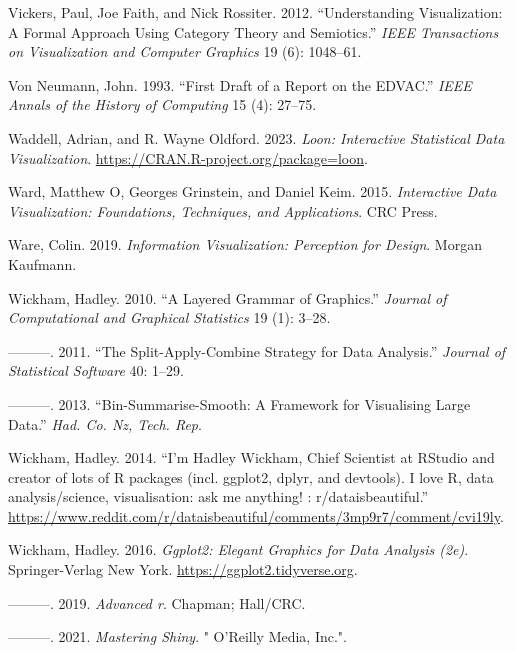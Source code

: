 \documentclass[
  openany]{book}
\newlength{\cslhangindent}
\newenvironment{CSLReferences}[2] %
 {\begin{list}{}{%
  \setlength{\itemindent}{0pt}
  \setlength{\leftmargin}{0pt}
  \setlength{\parsep}{0pt}
  \ifodd #1
   \setlength{\leftmargin}{\cslhangindent}
   \setlength{\itemindent}{-1\cslhangindent}
  \fi
  \setlength{\itemsep}{#2\baselineskip}}}
 {\end{list}}
\theoremstyle{definition}
\theoremstyle{definition}
\theoremstyle{definition}
\theoremstyle{definition}
\theoremstyle{remark}
\begin{document}
\begin{CSLReferences}{1}{0}
Vickers, Paul, Joe Faith, and Nick Rossiter. 2012. {``Understanding Visualization: A Formal Approach Using Category Theory and Semiotics.''} \emph{IEEE Transactions on Visualization and Computer Graphics} 19 (6): 1048--61.

Von Neumann, John. 1993. {``First Draft of a Report on the EDVAC.''} \emph{IEEE Annals of the History of Computing} 15 (4): 27--75.

Waddell, Adrian, and R. Wayne Oldford. 2023. \emph{Loon: Interactive Statistical Data Visualization}. \url{https://CRAN.R-project.org/package=loon}.

Ward, Matthew O, Georges Grinstein, and Daniel Keim. 2015. \emph{Interactive Data Visualization: Foundations, Techniques, and Applications}. CRC Press.

Ware, Colin. 2019. \emph{Information Visualization: Perception for Design}. Morgan Kaufmann.

Wickham, Hadley. 2010. {``A Layered Grammar of Graphics.''} \emph{Journal of Computational and Graphical Statistics} 19 (1): 3--28.

---------. 2011. {``The Split-Apply-Combine Strategy for Data Analysis.''} \emph{Journal of Statistical Software} 40: 1--29.

---------. 2013. {``Bin-Summarise-Smooth: A Framework for Visualising Large Data.''} \emph{Had. Co. Nz, Tech. Rep}.

Wickham, Hadley. 2014. {``{I'm Hadley Wickham, Chief Scientist at RStudio and creator of lots of R packages (incl. ggplot2, dplyr, and devtools). I love R, data analysis/science, visualisation: ask me anything! : r/dataisbeautiful}.''} \url{https://www.reddit.com/r/dataisbeautiful/comments/3mp9r7/comment/cvi19ly}.

Wickham, Hadley. 2016. \emph{Ggplot2: Elegant Graphics for Data Analysis (2e)}. Springer-Verlag New York. \url{https://ggplot2.tidyverse.org}.

---------. 2019. \emph{Advanced r}. Chapman; Hall/CRC.

---------. 2021. \emph{Mastering Shiny}. " O'Reilly Media, Inc.".


\end{CSLReferences}
\end{document}
